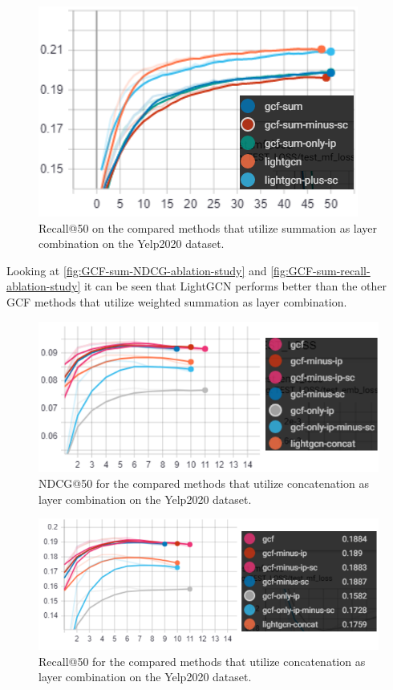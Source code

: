 \begin{figure}[h!]
    \includegraphics[width=\linewidth]{figures/gcf-sum-recall.png}
    \caption{Recall@50 on the compared methods that utilize summation as layer combination on the Yelp2020 dataset.}
    \label{fig:GCF-sum-recall-ablation-study}
\end{figure}
Looking at \autoref{fig:GCF-sum-NDCG-ablation-study} and \autoref{fig:GCF-sum-recall-ablation-study} it can be seen that LightGCN performs better than the other GCF methods that utilize weighted summation as layer combination.
\begin{figure}[h!]
    \includegraphics[width=\linewidth]{figures/gcf-ndcg-concat.png}
    \caption{NDCG@50 for the compared methods that utilize concatenation as layer combination on the Yelp2020 dataset.}
    \label{fig:GCF-NDCG-concat-ablation-study}
\end{figure}
\begin{figure}[h!]
    \includegraphics[width=\linewidth]{figures/gcf-concat-recall.png}
    \caption{Recall@50 for the compared methods that utilize concatenation as layer combination on the Yelp2020 dataset.}
    \label{fig:GCF-recall-concat-ablation-study}
\end{figure}

